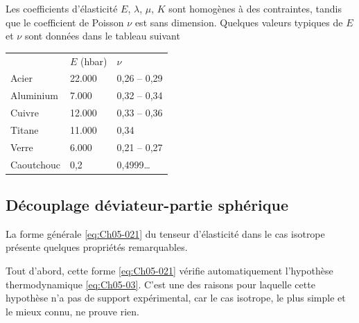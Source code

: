 Les coefficients d'élasticité $E$, $\lambda$, $\mu$, $K$ sont homogènes à des contraintes, tandis que le coefficient de Poisson $\nu$ est  sans  dimension.
Quelques valeurs typiques de $E$ et $\nu$  sont données dans le tableau suivant
\begin{center}
    \begin{tabular}[h]{lll}
        & $E$ (hbar) & $\nu$ \\
        Acier & 22.000 & 0,26 -- 0,29 \\
        Aluminium & 7.000 & 0,32 -- 0,34 \\
        Cuivre & 12.000 & 0,33 -- 0,36 \\
        Titane & 11.000 & 0,34 \\
        Verre & 6.000 & 0,21 -- 0,27 \\
        Caoutchouc & 0,2 & 0,4999\ldots
    \end{tabular}
\end{center}
 
\subsection{Découplage déviateur-partie sphérique}
La forme générale \eqref{eq:Ch05-021} du tenseur d'élasticité dans le cas isotrope présente quelques propriétés remarquables. 

Tout d'abord, cette forme \eqref{eq:Ch05-021} vérifie automatiquement l'hypothèse thermodynamique \eqref{eq:Ch05-03}.
C'est une des raisons pour laquelle cette hypothèse n'a pas de support expérimental, car le cas isotrope, le plus simple et le mieux connu, ne prouve rien. 

